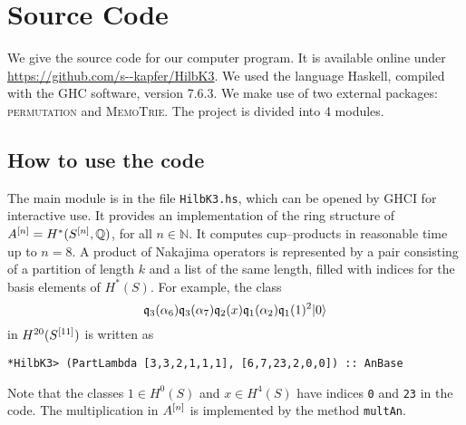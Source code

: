 \appendix
\section{Source Code}
We give the source code for our computer program. It is available online under \url{https://github.com/s--kapfer/HilbK3}. We used the language Haskell, compiled with the \textsc{GHC} software, version 7.6.3. We make use of two external packages: \textsc{permutation} and \textsc{MemoTrie}. The project is divided into 4 modules. 

\subsection{How to use the code}
The main module is in the file \verb|HilbK3.hs|, which can be opened by \textsc{GHCI} for interactive use. It provides an implementation of the ring structure of $A^{[n]}=H^*(S^{[n]},\mathbb{Q})$, for all $n\in\mathbb{N}$. 
It computes cup--products in reasonable time up to $n=8$.
A product of Nakajima operators is represented by a pair consisting of a partition of length $k$ and a list of the same length, filled with indices for the basis elements of $H^*(S)$. For example, the class
$$
\mathfrak{q}_{3}(\alpha_6)\mathfrak{q}_{3}(\alpha_7)\mathfrak{q}_2(x)\mathfrak{q}_{1}(\alpha_2)\mathfrak{q}_{1}(1)^2 |0\rangle 
$$
in $H^{20}(S^{[11]})$ is written as
\begin{verbatim}
*HilbK3> (PartLambda [3,3,2,1,1,1], [6,7,23,2,0,0]) :: AnBase 
\end{verbatim}
Note that the classes $1\in H^0(S)$ and $x\in H^4(S)$ have indices \verb|0| and \verb|23| in the code.
The multiplication in $A^{[n]}$ is implemented by the method \verb|multAn|. 

